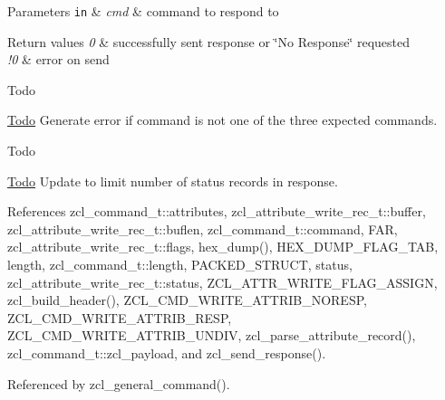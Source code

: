 \begin{DoxyParams}[1]{Parameters}
\mbox{\tt in}  & {\em cmd} & command to respond to\\
\hline
\end{DoxyParams}

\begin{DoxyRetVals}{Return values}
{\em 0} & successfully sent response or \char`\"{}\-No Response\char`\"{} requested \\
\hline
{\em !0} & error on send\\
\hline
\end{DoxyRetVals}
\begin{DoxyRefDesc}{Todo}
\item[\hyperlink{todo__todo000022}{Todo}]Generate error if command is not one of the three expected commands.\end{DoxyRefDesc}


\begin{DoxyRefDesc}{Todo}
\item[\hyperlink{todo__todo000023}{Todo}]Update to limit number of status records in response. \end{DoxyRefDesc}


References zcl\-\_\-command\-\_\-t\-::attributes, zcl\-\_\-attribute\-\_\-write\-\_\-rec\-\_\-t\-::buffer, zcl\-\_\-attribute\-\_\-write\-\_\-rec\-\_\-t\-::buflen, zcl\-\_\-command\-\_\-t\-::command, F\-A\-R, zcl\-\_\-attribute\-\_\-write\-\_\-rec\-\_\-t\-::flags, hex\-\_\-dump(), H\-E\-X\-\_\-\-D\-U\-M\-P\-\_\-\-F\-L\-A\-G\-\_\-\-T\-A\-B, length, zcl\-\_\-command\-\_\-t\-::length, P\-A\-C\-K\-E\-D\-\_\-\-S\-T\-R\-U\-C\-T, status, zcl\-\_\-attribute\-\_\-write\-\_\-rec\-\_\-t\-::status, Z\-C\-L\-\_\-\-A\-T\-T\-R\-\_\-\-W\-R\-I\-T\-E\-\_\-\-F\-L\-A\-G\-\_\-\-A\-S\-S\-I\-G\-N, zcl\-\_\-build\-\_\-header(), Z\-C\-L\-\_\-\-C\-M\-D\-\_\-\-W\-R\-I\-T\-E\-\_\-\-A\-T\-T\-R\-I\-B\-\_\-\-N\-O\-R\-E\-S\-P, Z\-C\-L\-\_\-\-C\-M\-D\-\_\-\-W\-R\-I\-T\-E\-\_\-\-A\-T\-T\-R\-I\-B\-\_\-\-R\-E\-S\-P, Z\-C\-L\-\_\-\-C\-M\-D\-\_\-\-W\-R\-I\-T\-E\-\_\-\-A\-T\-T\-R\-I\-B\-\_\-\-U\-N\-D\-I\-V, zcl\-\_\-parse\-\_\-attribute\-\_\-record(), zcl\-\_\-command\-\_\-t\-::zcl\-\_\-payload, and zcl\-\_\-send\-\_\-response().



Referenced by zcl\-\_\-general\-\_\-command().

